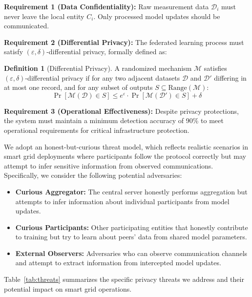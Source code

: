 \documentclass{ieeeaccess}
\theoremstyle{definition}
\newtheorem{definition}{Definition}
\begin{document}
\textbf{Requirement 1 (Data Confidentiality):} Raw measurement data $\mathcal{D}_i$ must never leave the local entity $C_i$. Only processed model updates should be communicated.

\textbf{Requirement 2 (Differential Privacy):} The federated learning process must satisfy $(\varepsilon, \delta)$-differential privacy, formally defined as:

\begin{definition}[Differential Privacy]
A randomized mechanism $\mathcal{M}$ satisfies $(\varepsilon, \delta)$-differential privacy if for any two adjacent datasets $\mathcal{D}$ and $\mathcal{D}'$ differing in at most one record, and for any subset of outputs $S \subseteq \text{Range}(\mathcal{M})$:
\begin{equation}
\Pr[\mathcal{M}(\mathcal{D}) \in S] \leq e^{\varepsilon} \cdot \Pr[\mathcal{M}(\mathcal{D}') \in S] + \delta
\end{equation}
\end{definition}

\textbf{Requirement 3 (Operational Effectiveness):} Despite privacy protections, the system must maintain a minimum detection accuracy of 90\% to meet operational requirements for critical infrastructure protection.

We adopt an honest-but-curious threat model, which reflects realistic scenarios in smart grid deployments where participants follow the protocol correctly but may attempt to infer sensitive information from observed communications. Specifically, we consider the following potential adversaries:

\begin{itemize}
\item \textbf{Curious Aggregator:} The central server honestly performs aggregation but attempts to infer information about individual participants from model updates.
\item \textbf{Curious Participants:} Other participating entities that honestly contribute to training but try to learn about peers' data from shared model parameters.
\item \textbf{External Observers:} Adversaries who can observe communication channels and attempt to extract information from intercepted model updates.
\end{itemize}

Table~\ref{tab:threats} summarizes the specific privacy threats we address and their potential impact on smart grid operations.
\end{document}

